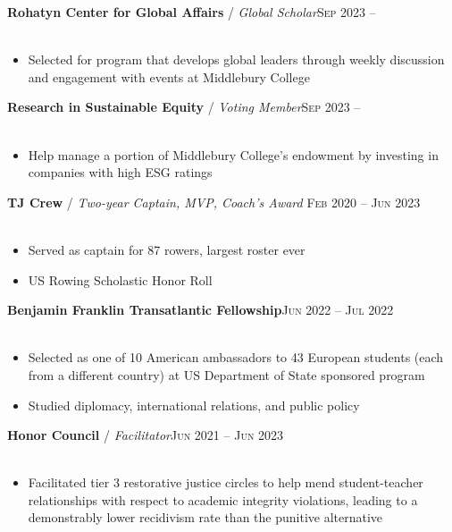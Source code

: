 \documentclass[12pt, a4paper]{article}
\begin{document}
\textbf{Rohatyn Center for Global Affairs} / \textit{Global Scholar}\hfill\textsc{Sep 2023 --}\\\
\begin{itemize}
    \vspace{-8mm}
    \item Selected for program that develops global leaders through weekly discussion and engagement with events at Middlebury College
\end{itemize}

\textbf{Research in Sustainable Equity} / \textit{Voting Member}\hfill\textsc{Sep 2023 --}\\\
\begin{itemize}
    \vspace{-8mm}
    \item Help manage a portion of Middlebury College's endowment by investing in companies with high ESG ratings
\end{itemize}

\textbf{TJ Crew} / \textit{Two-year Captain, MVP, Coach's Award }\hfill\textsc{Feb 2020 -- Jun 2023}\\\
\begin{itemize}
    \vspace{-8mm}
    \item Served as captain for 87 rowers, largest roster ever
    \item US Rowing Scholastic Honor Roll
\end{itemize}

\textbf{Benjamin Franklin Transatlantic Fellowship}\hfill\textsc{Jun 2022 -- Jul 2022}\\\
\begin{itemize}
    \vspace{-8mm}
    \item Selected as one of 10 American ambassadors to 43 European students (each from a different country) at US Department of State sponsored program
    \item Studied diplomacy, international relations, and public policy
\end{itemize}

\textbf{Honor Council} / \textit{Facilitator}\hfill\textsc{Jun 2021 -- Jun 2023}\\\
\begin{itemize}
    \vspace{-8mm}
    \item Facilitated tier 3 restorative justice circles to help mend student-teacher relationships with respect to academic integrity violations, leading to a demonstrably lower recidivism rate than the punitive alternative
\end{itemize}
\end{document}

